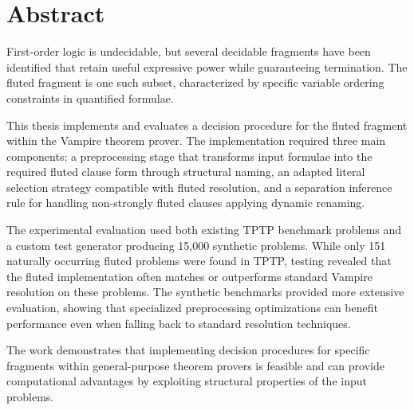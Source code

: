 \chapter*{Abstract}

First-order logic is undecidable, but several decidable fragments have been identified that retain useful expressive power while guaranteeing termination. The fluted fragment is one such subset, characterized by specific variable ordering constraints in quantified formulae.

This thesis implements and evaluates a decision procedure for the fluted fragment within the Vampire theorem prover. The implementation required three main components: a preprocessing stage that transforms input formulae into the required fluted clause form through structural naming, an adapted literal selection strategy compatible with fluted resolution, and a separation inference rule for handling non-strongly fluted clauses applying dynamic renaming.

The experimental evaluation used both existing TPTP benchmark problems and a custom test generator producing 15,000 synthetic problems. While only 151 naturally occurring fluted problems were found in TPTP, testing revealed that the fluted implementation often matches or outperforms standard Vampire resolution on these problems. The synthetic benchmarks provided more extensive evaluation, showing that specialized preprocessing optimizations can benefit performance even when falling back to standard resolution techniques.

The work demonstrates that implementing decision procedures for specific fragments within general-purpose theorem provers is feasible and can provide computational advantages by exploiting structural properties of the input problems.

